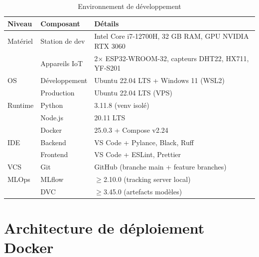 \documentclass[12pt,a4paper,twoside]{report}
\newcounter{hi}
\begin{document}
\begin{table}[H]
\centering
\caption{Environnement de développement}
\label{tab:env_dev}
\begin{tabularx}{\linewidth}{llX}
\toprule
\textbf{Niveau} & \textbf{Composant} & \textbf{Détails} \\
\midrule
Matériel & Station de dev & Intel Core i7-12700H, 32 GB RAM, GPU NVIDIA RTX 3060 \\
         & Appareils IoT  & 2$\times$ ESP32-WROOM-32, capteurs DHT22, HX711, YF-S201 \\
OS       & Développement  & Ubuntu 22.04 LTS + Windows 11 (WSL2) \\
         & Production     & Ubuntu 22.04 LTS (VPS) \\
Runtime  & Python         & 3.11.8 (venv isolé) \\
         & Node.js        & 20.11 LTS \\
         & Docker         & 25.0.3 + Compose v2.24 \\
IDE      & Backend        & VS Code + Pylance, Black, Ruff \\
         & Frontend       & VS Code + ESLint, Prettier \\
VCS      & Git            & GitHub (branche main + feature branches) \\
MLOps    & MLflow         & $\geq$2.10.0 (tracking server local) \\
         & DVC            & $\geq$3.45.0 (artefacts modèles) \\
\bottomrule
\end{tabularx}
\end{table}

\section{Architecture de déploiement Docker}
\end{document}
